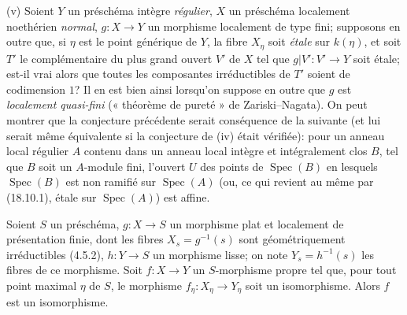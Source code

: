 \begin{remarks}[21.12.14]
(v) Soient $Y$ un préschéma intègre \emph{régulier}, $X$ un préschéma localement
noethérien \emph{normal}, $g:X\to Y$ un morphisme localement de type fini; supposons
en outre que, si $\eta$ est le point générique de $Y$, la fibre $X_\eta$ soit \emph{étale}
sur $k(\eta)$, et soit $T'$ le complémentaire du plus grand ouvert $V'$ de $X$ tel que
$g|V':V'\to Y$ soit étale; est-il vrai alors que toutes les composantes irréductibles de
$T'$ soient de codimension $1$? Il en est bien ainsi lorsqu'on suppose en outre que $g$
est \emph{localement quasi-fini} (« théorème de pureté » de Zariski--Nagata). On peut
montrer que la conjecture précédente serait conséquence de la suivante (et lui serait
même équivalente si la conjecture de (iv) était vérifiée): pour un anneau local régulier
$A$ contenu dans un anneau local intègre et intégralement clos $B$, tel que $B$ soit un
$A$-module fini, l'ouvert $U$ des points de $\operatorname{Spec}(B)$ en lesquels
$\operatorname{Spec}(B)$ est non ramifié sur $\operatorname{Spec}(A)$ (ou, ce qui
revient au même par (18.10.1), étale sur $\operatorname{Spec}(A)$) est affine.
\end{remarks}

\begin{proposition}[21.12.15]
\label{IV.21.12.15}
Soient $S$ un préschéma, $g:X\to S$ un morphisme plat et localement de présentation
finie, dont les fibres $X_s=g^{-1}(s)$ sont géométriquement irréductibles (4.5.2),
$h:Y\to S$ un morphisme lisse; on note $Y_s=h^{-1}(s)$ les fibres de ce morphisme.
Soit $f:X\to Y$ un $S$-morphisme propre tel que, pour tout point maximal $\eta$ de
$S$, le morphisme $f_\eta:X_\eta\to Y_\eta$ soit un isomorphisme. Alors $f$ est un
isomorphisme.
\end{proposition}

